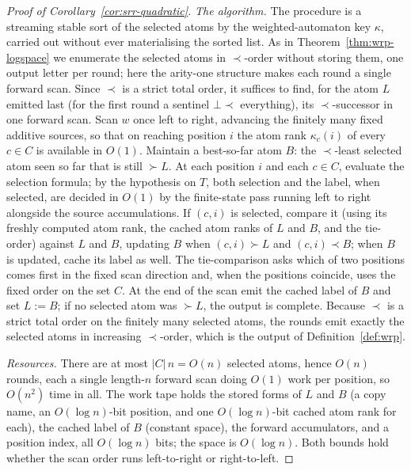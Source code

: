 \documentclass[11pt]{article}
\theoremstyle{definition}
\begin{document}
\begin{proof}[Proof of Corollary~\ref{cor:srr-quadratic}]
\vspace{0.5em}
\noindent\emph{The algorithm.}
The procedure is a streaming stable sort of the selected atoms by the
weighted-automaton key $\kappa$, carried out without ever materialising the
sorted list.  As in Theorem~\ref{thm:wrp-logspace} we enumerate the selected
atoms in $\prec$-order without storing them, one output letter per round; here
the arity-one structure makes each round a single forward scan.  Since $\prec$ is a
strict total order, it suffices to find, for the atom $L$ emitted last (for the
first round a sentinel $\bot\prec$ everything), its $\prec$-successor in one
forward scan.  Scan $w$ once left to right, advancing the finitely many fixed
additive sources, so that on reaching position $i$ the atom rank $\kappa_c(i)$
of every $c\in C$ is available in $O(1)$.  Maintain a best-so-far atom $B$: the
$\prec$-least selected atom seen so far that is still $\succ L$.  At each
position $i$ and each $c\in C$, evaluate the selection formula; by the hypothesis on
$T$, both selection and the label, when selected, are decided in $O(1)$ by the
finite-state pass running left to right alongside the source accumulations.  If $(c,i)$ is
selected, compare it (using its freshly computed atom rank, the cached atom ranks of
$L$ and $B$, and the tie-order) against $L$ and $B$, updating $B$ when
$(c,i)\succ L$ and $(c,i)\prec B$; when $B$ is updated, cache its label as
well.  The tie-comparison asks which of two positions comes first in the fixed
scan direction and, when the positions coincide, uses the fixed order on
the set $C$.  At the end of the scan emit the cached label of $B$ and set
$L:=B$; if no selected atom was $\succ L$, the output is complete.  Because
$\prec$ is a strict total order
on the finitely many selected atoms, the rounds emit exactly the selected atoms
in increasing $\prec$-order, which is the output of Definition~\ref{def:wrp}.

\vspace{0.5em}
\noindent\emph{Resources.}
There are at most $|C|\,n=O(n)$ selected atoms, hence $O(n)$ rounds, each a
single length-$n$ forward scan doing $O(1)$ work per position, so $O(n^2)$ time
in all.  The work tape holds the stored forms of $L$ and $B$ (a copy name, an
$O(\log n)$-bit position, and one $O(\log n)$-bit cached atom rank for each),
the cached
label of $B$ (constant space), the forward accumulators, and a position index,
all $O(\log n)$ bits; the space is
$O(\log n)$.  Both bounds hold whether the scan order runs left-to-right or
right-to-left.
\end{proof}
\end{document}
